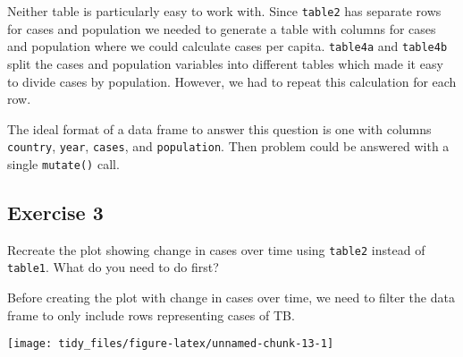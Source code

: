 \documentclass[]{book}
\newenvironment{Shaded}{\begin{snugshade}}{\end{snugshade}}
\newcommand{\DataTypeTok}[1]{\textcolor[rgb]{0.13,0.29,0.53}{#1}}
\newcommand{\KeywordTok}[1]{\textcolor[rgb]{0.13,0.29,0.53}{\textbf{#1}}}
\newcommand{\NormalTok}[1]{#1}
\newcommand{\OperatorTok}[1]{\textcolor[rgb]{0.81,0.36,0.00}{\textbf{#1}}}
\newcommand{\StringTok}[1]{\textcolor[rgb]{0.31,0.60,0.02}{#1}}
\theoremstyle{plain}
\theoremstyle{remark}
\theoremstyle{definition}
\theoremstyle{definition}
\theoremstyle{definition}
\theoremstyle{remark}
\begin{document}
Neither table is particularly easy to work with. Since \texttt{table2}
has separate rows for cases and population we needed to generate a table
with columns for cases and population where we could calculate cases per
capita. \texttt{table4a} and \texttt{table4b} split the cases and
population variables into different tables which made it easy to divide
cases by population. However, we had to repeat this calculation for each
row.

The ideal format of a data frame to answer this question is one with
columns \texttt{country}, \texttt{year}, \texttt{cases}, and
\texttt{population}. Then problem could be answered with a single
\texttt{mutate()} call.

\hypertarget{exercise-3-18}{%
\subsection{Exercise 3}\label{exercise-3-18}}

Recreate the plot showing change in cases over time using
\texttt{table2} instead of \texttt{table1}. What do you need to do
first?

Before creating the plot with change in cases over time, we need to
filter the data frame to only include rows representing cases of TB.

\begin{Shaded}
\end{Shaded}

\begin{center}\texttt{[image: tidy\_files/figure-latex/unnamed-chunk-13-1]} \end{center}
\end{document}
